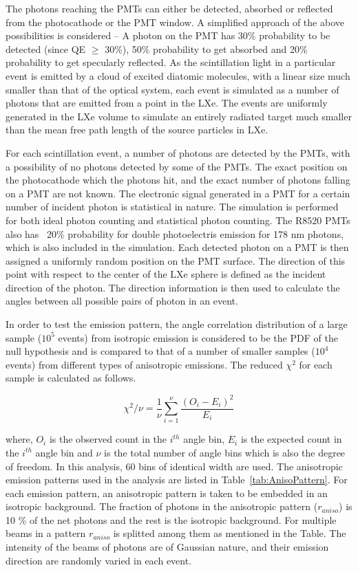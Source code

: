 The photons reaching the PMTs can either be detected, absorbed or reflected from the photocathode 
or the PMT window. A simplified approach of the above possibilities is considered -- 
A photon on the PMT has 30\% probability to be detected (since QE $\geq$ 30\%), 50\% probability to get 
absorbed and 20\% probability to get specularly reflected. As the scintillation light in a particular 
event is emitted by a cloud of excited diatomic molecules, with a linear size much smaller than that 
of the optical system, each event is simulated as a number of photons that are emitted from a point 
in the LXe. The events are uniformly generated in the LXe volume to simulate an entirely radiated 
target much smaller than the mean free path length of the source particles in LXe.

For each scintillation event, a number of photons are detected by the PMTs, with a possibility of 
no photons detected by some of the PMTs. The exact position on the photocathode which the photons hit, 
and the exact number of photons falling on a PMT are not known. The electronic signal generated in a PMT 
for a certain number of incident photon is statistical in nature. The simulation is performed for both 
ideal photon counting and statistical photon counting. The R8520 PMTs also has  ~20\% probability 
for double photoelectris emission for 178 nm photons, which is also included in the simulation.
Each detected photon 
on a PMT is then assigned a uniformly random position on the PMT surface. The direction of this point with respect 
to the center of the LXe sphere is defined as the incident direction of the photon. The direction information 
is then used to calculate the angles between all possible pairs of photon in an event.

In order to test the emission pattern, the angle correlation distribution of a large sample ($10^5$ events) 
from isotropic emission is considered to be the PDF of the null hypothesis and is compared 
to that of a number of smaller samples ($10^4$ events) from different types of anisotropic emissions. 
The reduced $\chi^2$ for each sample is calculated as follows.

\begin{equation}
\chi^2/\nu = \frac{1}{\nu} \sum^{\nu}_{i=1} \frac{(O_i - E_i)^2}{E_i}
\label{redchi2}
\end{equation}

where, $O_i$ is the observed count in the $i^{th}$ angle bin, $E_i$ is the expected count in the $i^{th}$ 
angle bin and $\nu$ is the total number of angle bins which is also the degree of freedom. In this analysis, 
60 bins of identical width are used. The anisotropic emission patterns used in the analysis are listed 
in Table~\ref{tab:AnisoPattern}. For each emission pattern,  an anisotropic pattern is taken to be embedded 
in an isotropic background. The fraction of photons in the anisotropic pattern ($r_{aniso}$) is 10 \% of the net photons 
and the rest is the isotropic background. For multiple beams in a pattern $r_{aniso}$ is splitted among them 
as mentioned in the Table. The intensity of the beams of photons are of Gaussian nature, and their emission direction are 
randomly varied in each event.

